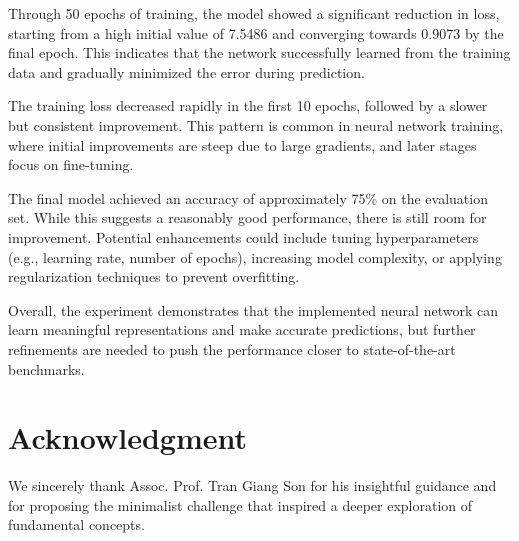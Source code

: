 \documentclass[conference]{IEEEtran}
\begin{document}
Through 50 epochs of training, the model showed a significant reduction in loss, starting from a high initial value of 7.5486 and converging towards 0.9073 by the final epoch. This indicates that the network successfully learned from the training data and gradually minimized the error during prediction.

The training loss decreased rapidly in the first 10 epochs, followed by a slower but consistent improvement. This pattern is common in neural network training, where initial improvements are steep due to large gradients, and later stages focus on fine-tuning.

The final model achieved an accuracy of approximately 75\% on the evaluation set. While this suggests a reasonably good performance, there is still room for improvement. Potential enhancements could include tuning hyperparameters (e.g., learning rate, number of epochs), increasing model complexity, or applying regularization techniques to prevent overfitting.

Overall, the experiment demonstrates that the implemented neural network can learn meaningful representations and make accurate predictions, but further refinements are needed to push the performance closer to state-of-the-art benchmarks.

\section*{Acknowledgment}

We sincerely thank Assoc. Prof. Tran Giang Son for his insightful guidance and for proposing the minimalist challenge that inspired a deeper exploration of fundamental concepts.
\end{document}
